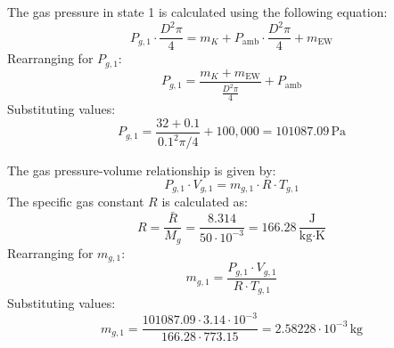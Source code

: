The gas pressure in state 1 is calculated using the following equation:  
\[
P_{g,1} \cdot \frac{D^2 \pi}{4} = m_K + P_{\text{amb}} \cdot \frac{D^2 \pi}{4} + m_{\text{EW}}
\]  
Rearranging for \( P_{g,1} \):  
\[
P_{g,1} = \frac{m_K + m_{\text{EW}}}{\frac{D^2 \pi}{4}} + P_{\text{amb}}
\]  
Substituting values:  
\[
P_{g,1} = \frac{32 + 0.1}{0.1^2 \pi / 4} + 100,000 = 101087.09 \, \text{Pa}
\]  

The gas pressure-volume relationship is given by:  
\[
P_{g,1} \cdot V_{g,1} = m_{g,1} \cdot R \cdot T_{g,1}
\]  
The specific gas constant \( R \) is calculated as:  
\[
R = \frac{\bar{R}}{M_g} = \frac{8.314}{50 \cdot 10^{-3}} = 166.28 \, \frac{\text{J}}{\text{kg·K}}
\]  
Rearranging for \( m_{g,1} \):  
\[
m_{g,1} = \frac{P_{g,1} \cdot V_{g,1}}{R \cdot T_{g,1}}
\]  
Substituting values:  
\[
m_{g,1} = \frac{101087.09 \cdot 3.14 \cdot 10^{-3}}{166.28 \cdot 773.15} = 2.58228 \cdot 10^{-3} \, \text{kg}
\]